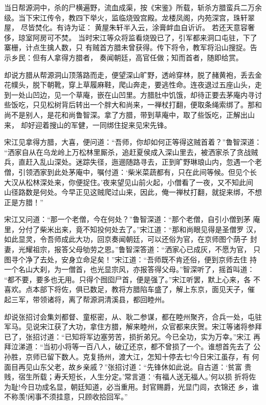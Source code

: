 当日帮源洞中，杀的尸横遍野，流血成渠，按《宋鉴》所载，斩杀方腊蛮兵二万余
级。当下宋江传令，教四下举火，监临烧毁宫殿。龙楼凤阁，内苑深宫，珠轩翠屋，
尽皆焚化。有诗为证：
黄屋朱轩半入云，涂膏衅血自䜣䜣。
若还天意容奢侈，琼室阿房可不焚。
当时宋江等众将监看烧毁已了，引军都来洞口屯驻，下了寨栅，计点生擒人数，只
有贼首方腊未曾获得。传下将令，教军将沿山搜捉。告示乡民：但有人拿得方腊者，
奏闻朝廷，高官任做；知而首者，随即给赏。

却说方腊从帮源洞山顶落路而走，便望深山旷野，透岭穿林，脱了赭黄袍，丢去金
花幞头，脱下朝靴，穿上草履麻鞋，爬山奔走，要逃性命。连夜退过五座山头，走
到一处山凹边，见一个草庵，嵌在山凹里。方腊肚中饥饿，却待正要去茅庵内寻讨
些饭吃，只见松树背后转出一个胖大和尚来，一禅杖打翻，便取条绳索绑了。那和
尚不是别人，是花和尚鲁智深。拿了方腊，带到草庵中，取了些饭吃，正解出山来，
却好迎着搜山的军健，一同绑住捉来见宋先锋。

宋江见拿得方腊，大喜，便问道：“吾师，你却如何正等得这贼首着？”鲁智深道：
“洒家自从在乌龙岭上万松林里厮杀，追赶夏侯成入深山里去，被洒家杀了贪战贼
兵，直赶入乱山深处。迷踪失径，迤逦随路寻去，正到旷野琳琅山内，忽遇一个老
僧，引领洒家到此处茅庵中，嘱付道：‘柴米菜蔬都有，只在此间等候。但见个长
大汉从松林深处来，你便捉住。’夜来望见山前火起，小僧看了一夜，又不知此间
山径路数是何处。今早正见这贼爬过山来，因此，俺一禅杖打翻，就捉来绑，不想
正是方腊！”

宋江又问道：“那一个老僧，今在何处？”鲁智深道：“那个老僧，自引小僧到茅
庵里，分付了柴米出来，竟不知投何处去了。”宋江道：“那和尚眼见得是圣僧罗
汉，如此显灵，令吾师成此大功，回京奏闻朝廷，可以还俗为官，在京师图个荫子
封妻，光耀祖宗，报答父母劬劳之恩。”鲁智深答道：“洒家心已成灰，不愿为官，
只图寻个净了去处，安身立命足矣！”宋江道：“吾师既不肯还俗，便到京师去住
持一个名山大刹，为一僧首，也光显宗风，亦报答得父母。”智深听了，摇首叫道：
“都不要，要多也无用。只得个囫囵尸首，便是强了。”宋江听罢，默上心来，各
不喜欢。点本部下将佐，俱已数足，教将方腊陷车盛了，解上东京，面见天子，催
起三军，带领诸将，离了帮源洞清溪县，都回睦州。

却说张招讨会集刘都督、童枢密，从、耿二参谋，都在睦州聚齐，合兵一处，屯驻
军马。见说宋江获了大功，拿住方腊，解来睦州，众官都来庆贺。宋江等诸将参拜
已了，张招讨道：“已知将军边塞劳苦，损折弟兄。今已全功，实为万幸。”宋江
再拜泣涕道：“当初小将等一百八人，破辽还京，都不曾损了一个。谁想首先去了
公孙胜，京师已留下数人。克复扬州，渡大江，怎知十停去七!今日宋江虽存，有
何面目再见山东父老，故乡亲戚？”张招讨道：“先锋休如此说。自古道：‘贫富
贵贱，宿生所载；寿夭短长，人生分定。’常言道：‘有福人送无福人。’何以损
折将佐为耻!今日功成名显，朝廷知道，必当重用。封官赐爵，光显门闾，衣锦还
乡，谁不称羡!闲事不须挂意，只顾收拾回军。”

